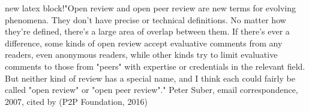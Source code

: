 new latex block!"Open
review and open peer review are new terms for evolving phenomena. They don't
have precise or technical definitions. No matter how they're defined, there's a
large area of overlap between them. If there's ever a difference, some kinds of
open review accept evaluative comments from any readers, even anonymous
readers, while other kinds try to limit evaluative comments to those from
"peers" with expertise or credentials in the relevant field. But
neither kind of review has a special name, and I think each could fairly be
called "open review" or "open peer review"."
Peter Suber, email
correspondence, 2007, cited by (P2P
Foundation, 2016)
